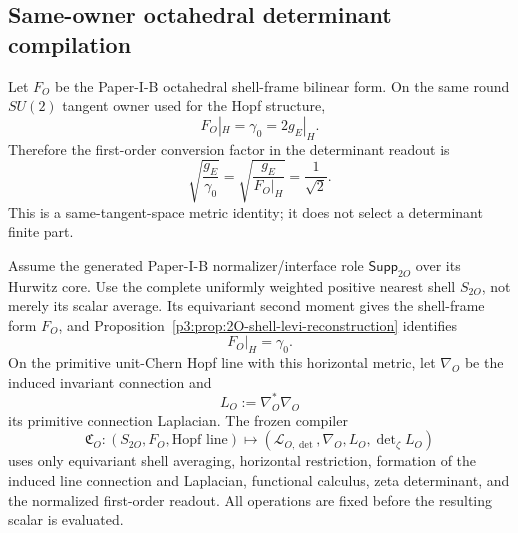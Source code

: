 \documentclass[12pt,a4paper]{article}
\begin{document}
\subsection{Same-owner octahedral determinant compilation}
\begin{proposition}
\label{p3:prop:2O-shell-levi-reconstruction}
Let \(F_O\) be the Paper-I-B octahedral shell-frame bilinear form.  On the same
round \(SU(2)\) tangent owner used for the Hopf structure,
\begin{equation}
\label{p3:eq:2O-shell-levi-reconstruction}
 \boxed{F_O|_H=\gamma_0=2g_E|_H.}
\end{equation}
Therefore the first-order conversion factor in the determinant readout is
\begin{equation}
\label{p3:eq:2O-shell-first-order-conversion}
 \boxed{\sqrt{\frac{g_E}{\gamma_0}}
 =\sqrt{\frac{g_E}{F_O|_H}}=\frac1{\sqrt2}.}
\end{equation}
This is a same-tangent-space metric identity; it does not select a
determinant finite part.
\end{proposition}

\begin{definition}
\label{p3c:def:octahedral-shell-determinant-compiler}
Assume the generated Paper-I-B normalizer/interface role
\(\mathsf{Supp}_{2O}\) over its Hurwitz core.  Use the complete uniformly
weighted positive nearest shell \(S_{2O}\), not merely its scalar average.
Its equivariant second moment gives the shell-frame form \(F_O\), and
Proposition~\ref{p3:prop:2O-shell-levi-reconstruction} identifies
\[
 F_O|_H=\gamma_0 .
\]
On the primitive unit-Chern Hopf line with this horizontal metric, let
\(\nabla_O\) be the induced invariant connection and
\[
 L_O:=\nabla_O^*\nabla_O
\]
its primitive connection Laplacian.  The frozen compiler
\[
 \mathfrak C_O:
 (S_{2O},F_O,\text{Hopf line})
 \longmapsto
 (\mathcal L_{O,\det},\nabla_O,L_O,\det\nolimits_\zeta L_O)
\]
uses only equivariant shell averaging, horizontal restriction, formation of
the induced line connection and Laplacian, functional calculus, zeta
determinant, and the normalized first-order readout.  All operations are
fixed before the resulting scalar is evaluated.
\end{definition}
\end{document}
